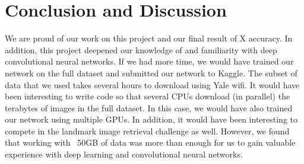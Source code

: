 \section{Conclusion and Discussion}
We are proud of our work on this project and our final result of X accuracy. In addition, this project deepened our knowledge of and familiarity with deep convolutional neural networks. If we had more time, we would have trained our network on the full dataset and submitted our network to Kaggle. The subset of data that we used takes several hours to download using Yale wifi. It would have been interesting to  write code so that several CPUs download (in parallel) the terabytes of images in the full dataset. In this case, we would have also trained our network using multiple GPUs. In addition, it would have been interesting to compete in the landmark image retrieval challenge as well. However, we found that working with ~50GB of data was more than enough for us to gain valuable experience with deep learning and convolutional neural networks.